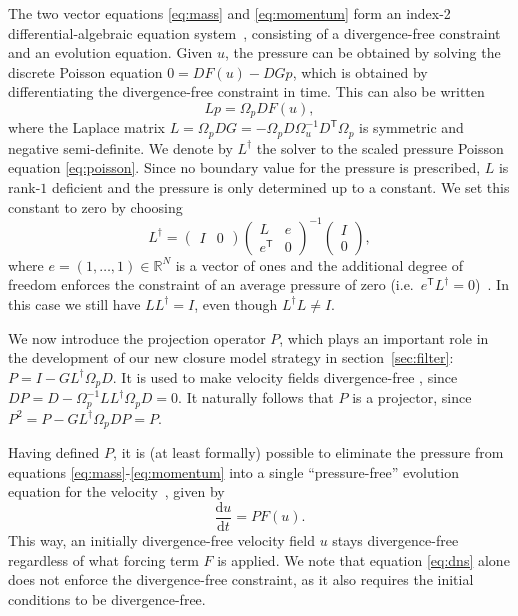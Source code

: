 \documentclass[preprint]{elsarticle}
\begin{document}
The two vector equations \eqref{eq:mass} and \eqref{eq:momentum} form an index-2
differential-algebraic equation system~\cite{Hairer1991,Hairer2006}, consisting
of a divergence-free constraint and an evolution equation. Given $u$, the
pressure can be obtained by solving the discrete Poisson equation $0 = D F(u) -
D G p$, which is obtained by differentiating the divergence-free constraint in
time. This can also be written
\begin{equation} \label{eq:poisson}
    L p = \Omega_p D F(u),
\end{equation}
where the Laplace matrix $L = \Omega_p D G = -\Omega_p D \Omega_u^{-1} D^\mathsf{T}
\Omega_p$ is symmetric and negative semi-definite. We denote by $L^\dagger$ the
solver to the scaled pressure Poisson equation \eqref{eq:poisson}.
Since no boundary value for the pressure is prescribed,
$L$ is rank-$1$ deficient and the pressure is only
determined up to a constant. We set this constant to zero by choosing
\begin{equation}
    L^\dagger = 
    \begin{pmatrix} I & 0\end{pmatrix}
    \begin{pmatrix} L & e \\ e^\mathsf{T} & 0 \end{pmatrix}^{-1}
    \begin{pmatrix} I \\ 0 \end{pmatrix},
\end{equation}
where $e = (1, \dots, 1) \in \mathbb{R}^N$ is a vector of ones and the
additional degree of freedom enforces the constraint of an average pressure of
zero (i.e.\ $e^\mathsf{T} L^\dagger = 0$)~\cite{Luenberger1970}. In this case we
still have $L L^\dagger = I$, even though $L^\dagger L \neq I$.

We now introduce the projection operator $P$, which plays an important role in the
development of our new closure model strategy in section~\ref{sec:filter}: $P =
I - G L^\dagger \Omega_p D$. It is used to make velocity fields divergence-free
\cite{Chorin1968}, since $D P = D - \Omega_p^{-1} L L^\dagger \Omega_p D = 0$.
It naturally follows that $P$ is a projector, since $P^2 = P - G L^\dagger
\Omega_p D P = P$.

Having defined $P$, it is (at least formally) possible to eliminate the pressure
from  equations \eqref{eq:mass}-\eqref{eq:momentum} into a single
``pressure-free'' evolution equation for the velocity~\cite{Sanderse2013}, given
by
\begin{equation} \label{eq:dns}
    \frac{\mathrm{d} u}{\mathrm{d} t} = P F(u).
\end{equation}
This way, an initially divergence-free velocity field $u$ stays divergence-free
regardless of what forcing term $F$ is applied. We note that equation \eqref{eq:dns}
alone does not enforce the divergence-free constraint, as it also requires the
initial conditions to be divergence-free.
\end{document}
